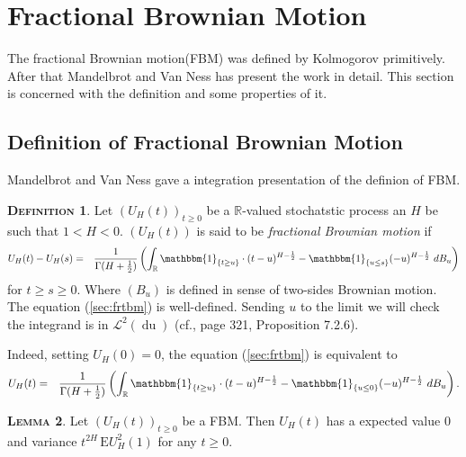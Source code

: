 \documentclass[a4paper, twoside, 11pt]{article}
\theoremstyle{definition}
\newtheorem{definition}{\scshape Definition}[section]
\newtheorem{lemma}[definition]{\scshape Lemma}
\newcommand{\brkt}[1]{\left({#1} \right)}
\begin{document}
\section{Fractional Brownian Motion}
\setcounter{equation}{0}
The fractional Brownian motion(FBM) was defined by Kolmogorov primitively. After that Mandelbrot and Van Ness has present the work in detail. This section is concerned with the definition and some properties of it.

\subsection{Definition of Fractional Brownian Motion}
Mandelbrot and Van Ness \cite{mandelbrot} gave a integration presentation of the definion of FBM.
\begin{definition}
  Let $(U_H(t))_{t\ge 0}$ be a $\mathbb{R}$-valued stochatstic process an $H$ be such that $1<H<0$. $(U_H(t))$ is said to be \emph{fractional Brownian motion} if 
  \begin{eqnarray}
	U_H(t) - U_H(s) &=& \frac{1}{\Gamma(H+\frac{1}{2})}\brkt{\int_{\mathbb{R}} \mathbbm{1}_{\{t\ge u\}}\cdot (t-u)^{H-\frac{1}{2}} - \mathbbm{1}_{\{u\le s\}} (-u)^{H-\frac{1}{2}} \, \mathop{dB_u}}
	\label{sec:frtbm}
  \end{eqnarray}
  for $t\ge s \ge 0$. Where $(B_u)$ is defined in sense of two-sides Brownian motion. The equation (\ref{sec:frtbm}) is well-defined. Sending $u$ to the limit  we will check the integrand is in $\mathcal{L}^2(\mathop{du})$ (cf.\cite{samorodnitsky}, page 321, Proposition 7.2.6).
\end{definition}

Indeed, setting $U_H(0) = 0$, the equation (\ref{sec:frtbm}) is equivalent to
	 \begin{eqnarray}
	   U_H(t) &=& \frac{1}{\Gamma(H+\frac{1}{2})}\brkt{\int_{\mathbb{R}} \mathbbm{1}_{\{t\ge u\}}\cdot (t-u)^{H-\frac{1}{2}} - \mathbbm{1}_{\{u\le 0\}} (-u)^{H-\frac{1}{2}} \, \mathop{dB_u}}.
	\label{sec:fbm}
  \end{eqnarray}

	
\begin{lemma}
  Let $(U_H(t))_{t\ge 0}$ be a FBM. Then $U_H(t)$ has a expected value $0$ and variance $t^{2H}\, \mathrm{E} U^2_H(1)$ for any $t \ge 0$.
  \label{sec:fbmp1}
\end{lemma}
\end{document}
